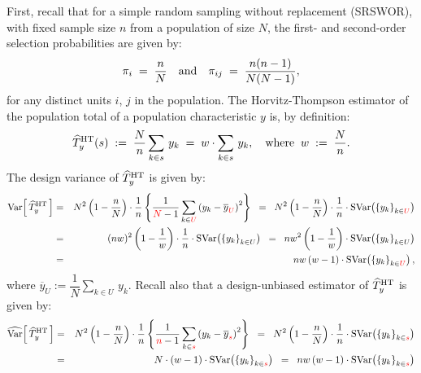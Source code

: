 First, recall that for a simple random sampling without replacement (SRSWOR),
with fixed sample size $n$ from a population of size $N$,
the first- and second-order selection probabilities are given by: 
\begin{equation*}
\pi_{i}\;=\;\dfrac{n}{N}
\quad\textnormal{and}\quad
\pi_{ij}\;=\;\dfrac{n(n-1)}{N(N-1)},
\end{equation*}
for any distinct units $i$, $j$ in the population.
The Horvitz-Thompson estimator of the population total of a population characteristic $y$ is, by definition:
\begin{equation*}
\widehat{T}^{\textnormal{HT}}_{y}(s)
\;:=\;\dfrac{N}{n}\sum_{k \in s}\,y_{k}
\;=\; w\cdot\sum_{k \in s}\,y_{k},
\quad\textnormal{where}\;\; w\;:=\;\dfrac{N}{n}.
\end{equation*}
The design variance of $\widehat{T}^{\textnormal{HT}}_{y}$ is given by:
\begin{eqnarray*}
\textnormal{Var}\!\left[\,\widehat{T}^{\textnormal{HT}}_{y}\,\right]
&=& N^{2}\left(1-\dfrac{n}{N}\right)\cdot\dfrac{1}{n}\left\{\dfrac{1}{{\color{red}N}-1}\sum_{k \in{\color{red}U}}\left(y_{k}-\overline{y}_{\color{red}U}\right)^{2}\right\}
\;\;=\;\; N^{2}\left(1-\dfrac{n}{N}\right)\cdot\dfrac{1}{n}\cdot\textnormal{SVar}\!\left(\left\{y_{k}\right\}_{k\in{\color{red}U}}\right) \\
&=& (nw)^{2}\left(1-\dfrac{1}{w}\right)\cdot\dfrac{1}{n}\cdot\textnormal{SVar}\!\left(\left\{y_{k}\right\}_{k\in U}\right)
\;\;=\;\; nw^{2}\left(1-\dfrac{1}{w}\right)\cdot\textnormal{SVar}\!\left(\left\{y_{k}\right\}_{k\in U}\right) \\
&=& nw\left(w-1\right)\cdot\textnormal{SVar}\!\left(\left\{y_{k}\right\}_{k\in{\color{red}U}}\right),
\end{eqnarray*}
where $\overline{y}_{U} := \dfrac{1}{N}\underset{k \in U}{\sum}\,y_{k}$.
Recall also that a design-unbiased estimator of $\widehat{T}^{\textnormal{HT}}_{y}$ is given by:
\begin{eqnarray*}
\widehat{\textnormal{Var}}\!\left[\,\widehat{T}^{\textnormal{HT}}_{y}\,\right]
&=& N^{2}\left(1-\dfrac{n}{N}\right)\cdot\dfrac{1}{n}\left\{\dfrac{1}{{\color{red}n}-1}\sum_{k \in{\color{red}s}}\left(y_{k}-\overline{y}_{\color{red}s}\right)^{2}\right\}
\;\;=\;\; N^{2}\left(1-\dfrac{n}{N}\right)\cdot\dfrac{1}{n}\cdot\textnormal{SVar}\!\left(\left\{y_{k}\right\}_{k\in{\color{red}s}}\right) \\
&=& N\cdot\left(w-1\right)\cdot\textnormal{SVar}\!\left(\left\{y_{k}\right\}_{k\in{\color{red}s}}\right)
\;\;=\;\; nw\left(w-1\right)\cdot\textnormal{SVar}\!\left(\left\{y_{k}\right\}_{k\in{\color{red}s}}\right)
\end{eqnarray*}
